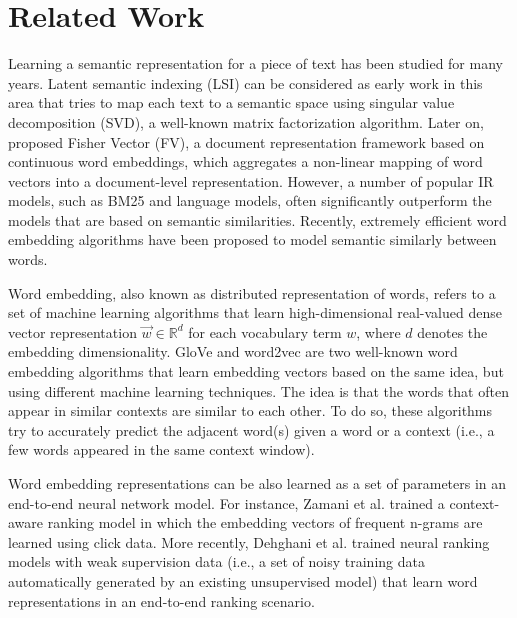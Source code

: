 \documentclass[sigconf]{acmart}
\begin{document}
\vspace{-0.4cm}
\section{Related Work}
\label{sec:rel}
Learning a semantic representation for a piece of text has been studied for many years. Latent semantic indexing (LSI) \cite{Deerwester:1988} can be considered as early work in this area that tries to map each text to a semantic space using singular value decomposition (SVD), a well-known matrix factorization algorithm. Later on, \citet{Clinchant:2013} proposed Fisher Vector (FV), a document representation framework based on continuous word embeddings, which aggregates a non-linear mapping of word vectors into a document-level representation. However, a number of popular IR models, such as BM25 and language models, often significantly outperform the models that are based on semantic similarities. Recently, extremely efficient word embedding algorithms have been proposed to model semantic similarly between words.

Word embedding, also known as distributed representation of words, refers to a set of machine learning algorithms that learn high-dimensional real-valued dense vector representation $\vec{w} \in \mathbb{R}^d$ for each vocabulary term $w$, where $d$ denotes the embedding dimensionality. GloVe \cite{Pennington:2014} and word2vec \cite{Mikolov:2013} are two well-known word embedding algorithms that learn embedding vectors based on the same idea, but using different machine learning techniques. The idea is that the words that often appear in similar contexts are similar to each other. To do so, these algorithms try to accurately predict the adjacent word(s) given a word or a context (i.e., a few words appeared in the same context window). 

Word embedding representations can be also learned as a set of parameters in an end-to-end neural network model. For instance, Zamani et al. \cite{Zamani:2017} trained a context-aware ranking model in which the embedding vectors of frequent n-grams are learned using click data. More recently, Dehghani et al. \cite{Dehghani:2017} trained neural ranking models with weak supervision data (i.e., a set of noisy training data automatically generated by an existing unsupervised model) that learn word representations in an end-to-end ranking scenario.
\end{document}
